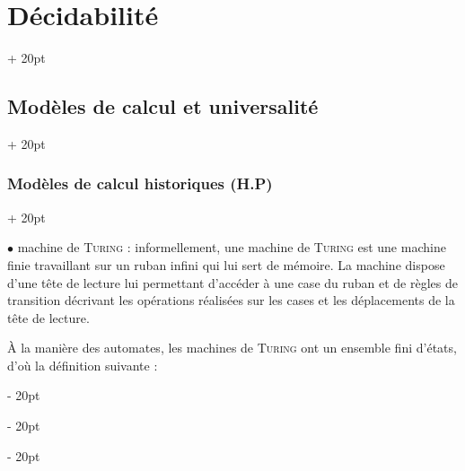 \documentclass[a4paper, 12pt, twoside]{article}
\newcommand{\ind}[1][20pt]{\advance\leftskip + #1}
\newcommand{\deind}[1][20pt]{\advance\leftskip - #1}
\newenvironment{indt}[2][20pt]{#2 \par \ind[#1]}{\par \deind} %
\begin{document}
\begin{indt}{\section{Décidabilité}}
\begin{indt}{\subsection{Modèles de calcul et universalité}}
\begin{indt}{\subsubsection{Modèles de calcul historiques (H.P)}}
                \vspace{6pt}
                
                $\bullet$ machine de \textsc{Turing} : informellement, une machine de \textsc{Turing} est une machine finie travaillant sur un ruban infini qui lui sert de mémoire.
                La machine dispose d'une tête de lecture lui permettant d'accéder à une case du ruban et de règles de transition décrivant les opérations réalisées sur les cases et les déplacements de la tête de lecture.


                \begin{center}
                \end{center}

                \`A la manière des automates, les machines de \textsc{Turing} ont un ensemble fini d'états, d'où la définition suivante :


\end{indt}
\end{indt}
\end{indt}
\end{document}
